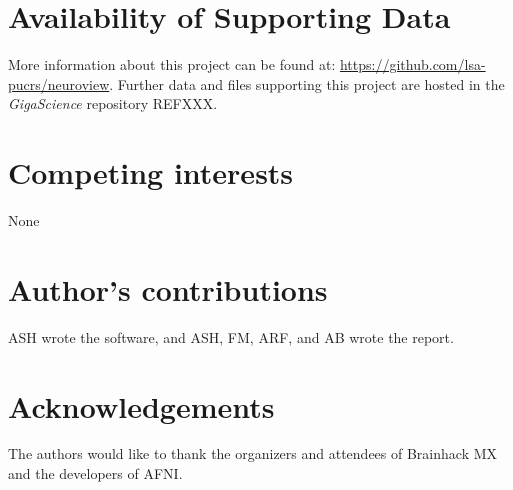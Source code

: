 \documentclass[twocolumn]{bmcart}%
\begin{document}

\begin{backmatter}

\section*{Availability of Supporting Data}
More information about this project can be found at: \url{https://github.com/lsa-pucrs/neuroview}. Further data and files supporting this project are hosted in the \emph{GigaScience} repository REFXXX.

\section*{Competing interests}
None

\section*{Author's contributions}
ASH wrote the software, and ASH, FM, ARF, and AB wrote the report.

\section*{Acknowledgements}
The authors would like to thank the organizers and attendees of
Brainhack MX and the developers of AFNI.

  
  


\end{backmatter}
\end{document}
